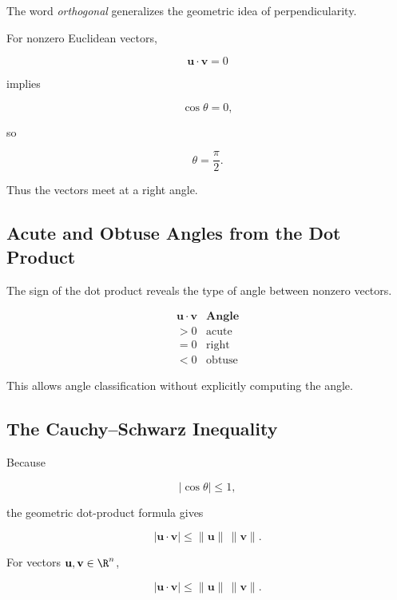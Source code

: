 The word \emph{orthogonal} generalizes the geometric idea of
perpendicularity.

For nonzero Euclidean vectors,

\[ \mathbf{u}\cdot\mathbf{v}=0 \]

implies

\[ \cos\theta=0, \]

so

\[ \theta=\frac{\pi}{2}. \]

Thus the vectors meet at a right angle.

\subsection{Acute and Obtuse Angles from the Dot Product}
\label{subsec:dot-product-angle-sign}

The sign of the dot product reveals the type of angle between nonzero
vectors.

\[
\begin{array}{c|c}
\mathbf{u}\cdot\mathbf{v} & \textbf{Angle}\\
\hline
>0 & \text{acute}\\
=0 & \text{right}\\
<0 & \text{obtuse}
\end{array}
\]

This allows angle classification without explicitly computing the angle.

\subsection{The Cauchy--Schwarz Inequality}
\label{subsec:cauchy-schwarz-vector-geometry}

Because

\[ |\cos\theta|\leq1, \]

the geometric dot-product formula gives

\[
|\mathbf{u}\cdot\mathbf{v}|
\leq
\|\mathbf{u}\|\,\|\mathbf{v}\|.
\]

\begin{theorem}
For vectors \(\mathbf{u},\mathbf{v}\in\R^n\),

\[ \boxed{|\mathbf{u}\cdot\mathbf{v}|
\leq\|\mathbf{u}\|\,\|\mathbf{v}\|.} \]
\end{theorem}

